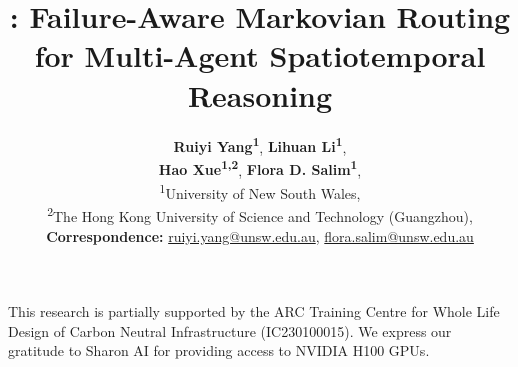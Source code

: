 \documentclass{article}
\title{\starname: Failure-Aware Markovian Routing for Multi-Agent Spatiotemporal Reasoning}
\author{
 \textbf{Ruiyi Yang\textsuperscript{1}},
 \textbf{Lihuan Li\textsuperscript{1}}, \\
 \textbf{Hao Xue\textsuperscript{1,2}},
 \textbf{Flora D. Salim\textsuperscript{1}},
\\
 \textsuperscript{1}University of New South Wales, \\
 \textsuperscript{2}The Hong Kong University of Science and Technology
(Guangzhou), \\
 \small{
   \textbf{Correspondence:} \href{mailto:ruiyi.yang@unsw.edu.au}{ruiyi.yang@unsw.edu.au},
   \href{mailto:flora.salim@unsw.edu.au}{flora.salim@unsw.edu.au}
 }
}
\begin{document}
\maketitle









\begin{ack}
This research is partially supported by the ARC Training Centre for Whole Life Design of Carbon Neutral Infrastructure (IC230100015). We express our gratitude to Sharon AI for providing access to NVIDIA
H100 GPUs.
\end{ack}




\newpage
\appendix


\clearpage

% 
\end{document}
